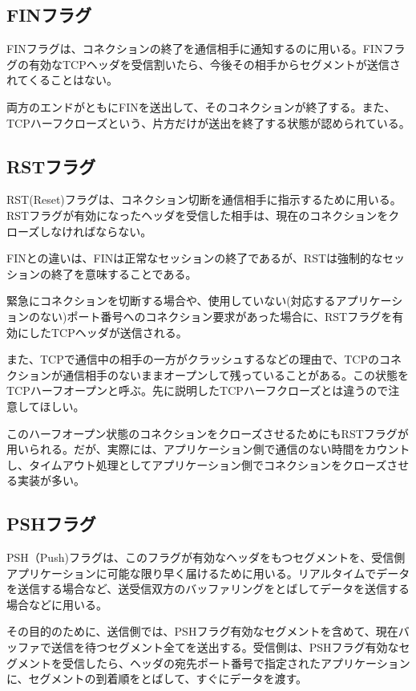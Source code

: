 \subsection{FINフラグ}
FINフラグは、コネクションの終了を通信相手に通知するのに用いる。FINフラグの有効なTCPヘッダを受信割いたら、今後その相手からセグメントが送信されてくることはない。

両方のエンドがともにFINを送出して、そのコネクションが終了する。また、TCPハーフクローズという、片方だけが送出を終了する状態が認められている。


\subsection{RSTフラグ}
RST(Reset)フラグは、コネクション切断を通信相手に指示するために用いる。RSTフラグが有効になったヘッダを受信した相手は、現在のコネクションをクローズしなければならない。

FINとの違いは、FINは正常なセッションの終了であるが、RSTは強制的なセッションの終了を意味することである。

緊急にコネクションを切断する場合や、使用していない(対応するアプリケーションのない)ポート番号へのコネクション要求があった場合に、RSTフラグを有効にしたTCPヘッダが送信される。

また、TCPで通信中の相手の一方がクラッシュするなどの理由で、TCPのコネクションが通信相手のないままオープンして残っていることがある。この状態をTCPハーフオープンと呼ぶ。先に説明したTCPハーフクローズとは違うので注意してほしい。

このハーフオープン状態のコネクションをクローズさせるためにもRSTフラグが用いられる。だが、実際には、アプリケーション側で通信のない時間をカウントし、タイムアウト処理としてアプリケーション側でコネクションをクローズさせる実装が多い。


\subsection{PSHフラグ}
PSH（Push)フラグは、このフラグが有効なヘッダをもつセグメントを、受信側アプリケーションに可能な限り早く届けるために用いる。リアルタイムでデータを送信する場合など、送受信双方のバッファリングをとばしてデータを送信する場合などに用いる。

その目的のために、送信側では、PSHフラグ有効なセグメントを含めて、現在バッファで送信を待つセグメント全てを送出する。受信側は、PSHフラグ有効なセグメントを受信したら、ヘッダの宛先ポート番号で指定されたアプリケーションに、セグメントの到着順をとばして、すぐにデータを渡す。

